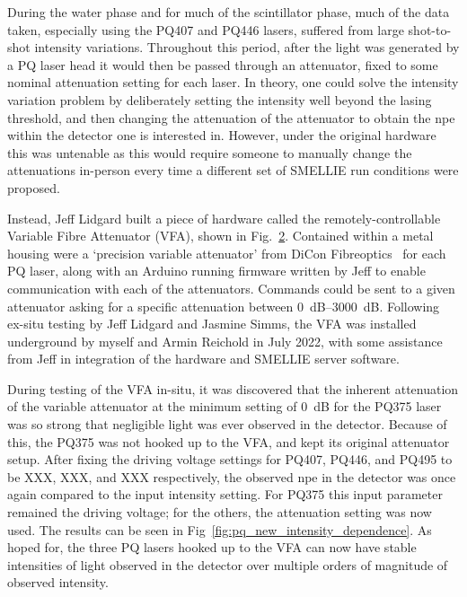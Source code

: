 \begin{figure}
    \centering
    \caption[]{}
    \label{fig:pq_threshold_intensity_variation}
\end{figure}

During the water phase and for much of the scintillator phase, much of the data taken, especially using the PQ407 and PQ446 lasers, suffered from large shot-to-shot intensity variations. Throughout this period, after the light was generated by a PQ laser head it would then be passed through an attenuator, fixed to some nominal attenuation setting for each laser. In theory, one could solve the intensity variation problem by deliberately setting the intensity well beyond the lasing threshold, and then changing the attenuation of the attenuator to obtain the npe within the detector one is interested in. However, under the original hardware this was untenable as this would require someone to manually change the attenuations in-person every time a different set of SMELLIE run conditions were proposed.

Instead, Jeff Lidgard built a piece of hardware called the remotely-controllable Variable Fibre Attenuator (VFA), shown in Fig.~\ref{fig:vfa_picture}. Contained within a metal housing were a `precision variable attenuator' from DiCon Fibreoptics~\cite{} %
for each PQ laser, along with an Arduino running firmware written by Jeff to enable communication with each of the attenuators. Commands could be sent to a given attenuator asking for a specific attenuation between \SIrange{0}{3000}{\dB}.
Following ex-situ testing by Jeff Lidgard and Jasmine Simms, the VFA was installed underground by myself and Armin Reichold in July 2022, with some assistance from Jeff in integration of the hardware and SMELLIE server software.

\begin{figure}
    \centering
    \caption[]{}
    \label{fig:vfa_picture}
\end{figure}

During testing of the VFA in-situ, it was discovered that the inherent attenuation of the variable attenuator at the minimum setting of \SI{0}{\dB} for the PQ375 laser was so strong that negligible light was ever observed in the detector. Because of this, the PQ375 was not hooked up to the VFA, and kept its original attenuator setup. After fixing the driving voltage settings for PQ407, PQ446, and PQ495 to be XXX, XXX, and XXX respectively, %
the observed npe in the detector was once again compared to the input intensity setting. For PQ375 this input parameter remained the driving voltage; for the others, the attenuation setting was now used. The results can be seen in Fig~\ref{fig:pq_new_intensity_dependence}. As hoped for, the three PQ lasers hooked up to the VFA can now have stable intensities of light observed in the detector over multiple orders of magnitude of observed intensity.

